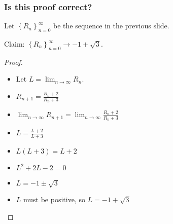 \documentclass[14pt]{beamer}
\begin{document}
	\begin{frame}[t]
		\fontsize{13}{13}\selectfont
		\frametitle{Is this proof correct?}
		Let $\displaystyle \left\{ R_{n} \right\}_{n=0}^{\infty}$ be the sequence in
		the previous slide.
		\begin{block}{Claim:}
			$\displaystyle \left\{ R_{n} \right\}_{n=0}^{\infty}\longrightarrow -1 + \sqrt{3}$.
		\end{block}
		\begin{proof}
			\begin{multicols}{2}
				\begin{itemize}
					\item Let $\displaystyle L = \lim_{n \to \infty}R_{n}$.

					\item $\displaystyle R_{n+1}= \frac{R_{n}+ 2}{ R_{n}+ 3}$

					\item $\displaystyle \lim_{n \to \infty }R_{n+1}= \lim_{n \to \infty }\frac{R_{n}+
						2}{ R_{n}+ 3}$

					\item $\displaystyle L = \frac{L + 2}{ L + 3}$

					\item $\displaystyle L(L+3) = L + 2$

					\item $\displaystyle L^{2}+2L - 2 = 0$

					\item $\displaystyle L = -1 \pm \sqrt{3}$

					\item $\displaystyle L$ must be positive, so
						$\displaystyle L = -1 + \sqrt{3}$
				\end{itemize}
			\end{multicols}
		\end{proof}
	\end{frame}
\end{document}
